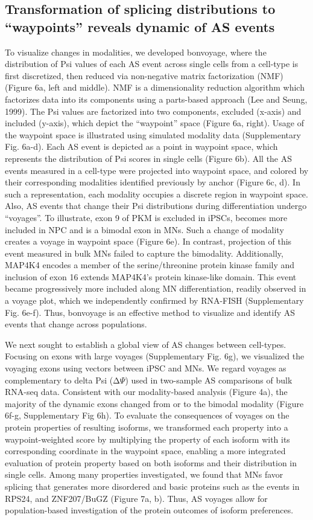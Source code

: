\subsection{Transformation of splicing distributions to “waypoints” reveals dynamic of AS events}

To visualize changes in modalities, we developed bonvoyage, where the distribution of Psi values of each AS event across single cells from a cell-type is first discretized, then reduced via non-negative matrix factorization (NMF) (Figure 6a, left and middle). NMF is a dimensionality reduction algorithm which factorizes data into its components using a parts-based approach (Lee and Seung, 1999). The Psi values are factorized into two components, excluded (x-axis) and included (y-axis), which depict the “waypoint” space (Figure 6a, right). Usage of the waypoint space is illustrated using simulated modality data (Supplementary Fig. 6a-d). Each AS event is depicted as a point in waypoint space, which represents the distribution of Psi scores in single cells (Figure 6b). All the AS events measured in a cell-type were projected into waypoint space, and colored by their corresponding modalities identified previously by anchor (Figure 6c, d). In such a representation, each modality occupies a discrete region in waypoint space. Also, AS events that change their Psi distributions during differentiation undergo “voyages”. To illustrate, exon 9 of PKM is excluded in iPSCs, becomes more included in NPC and is a bimodal exon in MNs. Such a change of modality creates a voyage in waypoint space (Figure 6e). In contrast, projection of this event measured in bulk MNs failed to capture the bimodality. Additionally, MAP4K4 encodes a member of the serine/threonine protein kinase family and inclusion of exon 16 extends MAP4K4’s protein kinase-like domain. This event became progressively more included along MN differentiation, readily observed in a voyage plot, which we independently confirmed by RNA-FISH (Supplementary Fig. 6e-f). Thus, bonvoyage is an effective method to visualize and identify AS events that change across populations.

We next sought to establish a global view of AS changes between cell-types. Focusing on exons with large voyages (Supplementary Fig. 6g), we visualized the voyaging exons using vectors between iPSC and MNs. We regard voyages as complementary to delta Psi (Δ$\Psi$) used in two-sample AS comparisons of bulk RNA-seq data. Consistent with our modality-based analysis (Figure 4a), the majority of the dynamic exons changed from or to the bimodal modality (Figure 6f-g, Supplementary Fig 6h). To evaluate the consequences of voyages on the protein properties of resulting isoforms, we transformed each property into a waypoint-weighted score by multiplying the property of each isoform with its corresponding coordinate in the waypoint space, enabling a more integrated evaluation of protein property based on both isoforms and their distribution in single cells. Among many properties investigated, we found that MNs favor splicing that generates more disordered and basic proteins such as the events in RPS24, and ZNF207/BuGZ (Figure 7a, b). Thus, AS voyages allow for population-based investigation of the protein outcomes of isoform preferences. 


